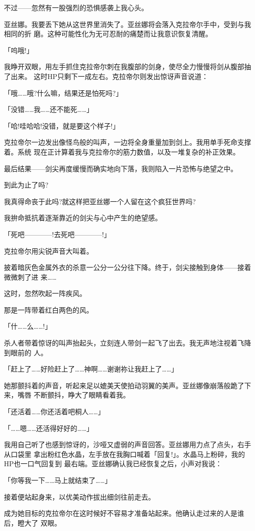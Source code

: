 \documentclass[11pt]{book}
\begin{document}
不过——忽然有一股强烈的恐惧感袭上我心头。

亚丝娜。我要丢下她从这世界里消失了。亚丝娜将会落入克拉帝尔手中，受到与我相同的折
磨。这种可能性化为无可忍耐的痛楚而让我意识恢复清醒。

「呜哦!」

我睁开双眼，用左手抓住克拉帝尔刺在我腹部的剑身，使尽全力慢慢将剑从腹部抽了出来。
这时HP只剩下一成左右。克拉帝尔则发出惊讶声音说道：

「哦……哦?什么嘛，结果还是怕死吗?」

「没错……我……还不能死……」

「哈!哇哈哈!没错，就是要这个样子!」

克拉帝尔一边发出像怪鸟般的叫声，一边将全身重量加到剑上。我用单手死命支撑着。系统
现在正计算着我与克拉帝尔的筋力数值，以及一堆复杂的补正效果。

最后结果——剑尖再度缓慢而确实地向下落，我则陷入一片恐怖与绝望之中。

到此为止了吗?

我真得命丧于此吗?就这样把亚丝娜一个人留在这个疯狂世界吗?

我拚命抵抗着逐渐靠近的剑尖与心中产生的绝望感。

「死吧————!去死吧————!」

克拉帝尔用尖锐声音大叫着。

披着暗灰色金属外衣的杀意一公分一公分往下降。终于，剑尖接触到身体——接着微微刺了进
来……

这时，忽然吹起一阵疾风。

那是一阵带着红白两色的风。

「什……么……!」

杀人者带着惊讶的叫声抬起头，立刻连人带剑一起飞了出去。我无声地注视着飞降到眼前的
人。

「赶上了……好险赶上了……神啊……谢谢祢让我赶上了……」

她那颤抖着的声音，听起来足以媲美天使拍动羽翼的美声。亚丝娜像崩落般跪了下来，嘴唇
不断颤抖，睁大了眼睛看着我。

「还活着……你还活着吧桐人……」

「……嗯……还活得好好的……」

我用自己听了也感到惊讶的，沙哑又虚弱的声音回答。亚丝娜用力点了点头，右手从口袋里
拿出粉红色水晶，左手放在我胸口喊着「回复!」。水晶马上粉碎，我的HP也一口气回复到
最右端。亚丝娜确认我已经恢复之后，小声对我说：

「你等我一下……马上就结束了……」

接着便站起身来，以优美动作拔出细剑往前走去。

成为她目标的克拉帝尔在这时候好不容易才准备站起来。他确认走过来的人是谁后，瞪大了
双眼。
\end{document}

